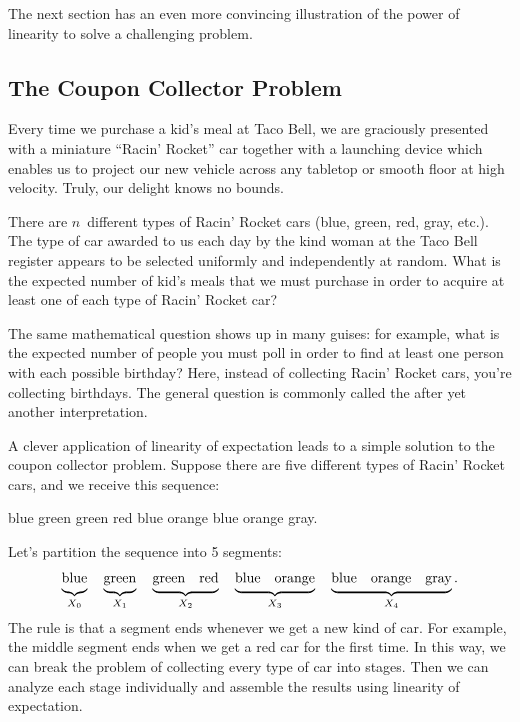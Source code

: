 The next section has an even more convincing illustration of the power
of linearity to solve a challenging problem.

\subsection{The Coupon Collector Problem}

Every time we purchase a kid's meal at Taco Bell, we are graciously
presented with a miniature ``Racin' Rocket'' car together with a
launching device which enables us to project our new vehicle across
any tabletop or smooth floor at high velocity.  Truly, our delight
knows no bounds.

There are $n$~different types of Racin' Rocket cars (blue, green, red,
gray, etc.).  The type of car awarded to us each day by the kind woman
at the Taco Bell register appears to be selected uniformly and
independently at random.  What is the expected number of kid's meals
that we must purchase in order to acquire at least one of each type of
Racin' Rocket car?

The same mathematical question shows up in many guises: for example,
what is the expected number of people you must poll in order to find
at least one person with each possible birthday?  Here, instead of
collecting Racin' Rocket cars, you're collecting birthdays.  The
general question is commonly called the  after yet another interpretation.

A clever application of linearity of expectation leads to a simple
solution to the coupon collector problem.  Suppose there are five
different types of Racin' Rocket cars, and we receive this sequence:
%
\begin{center}
blue \quad green \quad green \quad red \quad blue \quad orange \quad
blue \quad orange \quad gray.
\end{center}
%
Let's partition the sequence into 5 segments:
%
\[
\underbrace{\strut\text{blue}}_{X_0} \quad
\underbrace{\strut\text{green}}_{X_1} \quad
\underbrace{\strut\text{green} \quad \text{red}}_{X_2} \quad
\underbrace{\strut\text{blue} \quad \text{orange}}_{X_3} \quad
\underbrace{\strut\text{blue} \quad \text{orange} \quad \text{gray}}_{X_4}.
\]
%
The rule is that a segment ends whenever we get a new kind of car.
For example, the middle segment ends when we get a red car for the
first time.  In this way, we can break the problem of collecting every
type of car into stages.  Then we can analyze each stage individually
and assemble the results using linearity of expectation.


